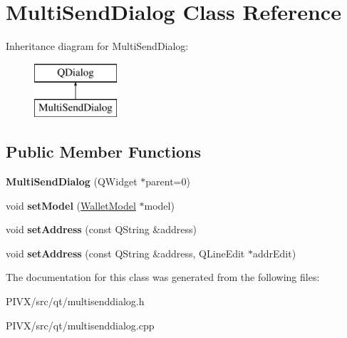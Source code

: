 \hypertarget{class_multi_send_dialog}{}\section{Multi\+Send\+Dialog Class Reference}
\label{class_multi_send_dialog}
Inheritance diagram for Multi\+Send\+Dialog\+:\begin{figure}[H]
\begin{center}
\leavevmode
\includegraphics[height=2.000000cm]{class_multi_send_dialog}
\end{center}
\end{figure}
\subsection*{Public Member Functions}
\begin{DoxyCompactItemize}
\item 
\mbox{\label{class_multi_send_dialog_a496bc521a761a49ef3e158e524bed22a}} 
{\bfseries Multi\+Send\+Dialog} (Q\+Widget $\ast$parent=0)
\item 
\mbox{\label{class_multi_send_dialog_aef8d0e5e3399fa8053ab5a0e38eae152}} 
void {\bfseries set\+Model} (\mbox{\hyperlink{class_wallet_model}{Wallet\+Model}} $\ast$model)
\item 
\mbox{\label{class_multi_send_dialog_acc93dd843ead555a3c6eac6b8c91e777}} 
void {\bfseries set\+Address} (const Q\+String \&address)
\item 
\mbox{\label{class_multi_send_dialog_a7db24574d514cbd14814a077f7cd6516}} 
void {\bfseries set\+Address} (const Q\+String \&address, Q\+Line\+Edit $\ast$addr\+Edit)
\end{DoxyCompactItemize}


The documentation for this class was generated from the following files\+:\begin{DoxyCompactItemize}
\item 
P\+I\+V\+X/src/qt/multisenddialog.\+h\item 
P\+I\+V\+X/src/qt/multisenddialog.\+cpp\end{DoxyCompactItemize}
